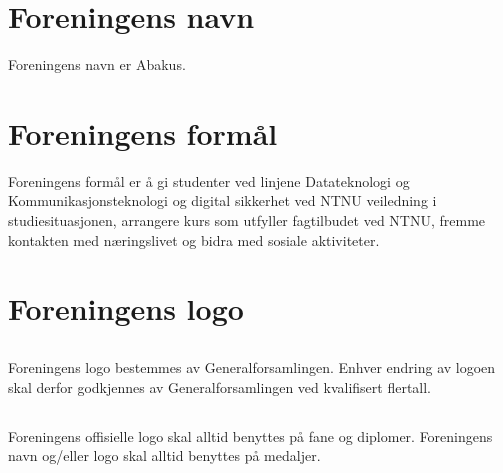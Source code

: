 \section{Foreningens navn}
Foreningens navn er Abakus.

\section{Foreningens formål}
Foreningens formål er å gi studenter ved linjene Datateknologi og
Kommunikasjonsteknologi og digital sikkerhet ved NTNU veiledning i
studiesituasjonen, arrangere kurs som utfyller fagtilbudet ved NTNU,
fremme kontakten med næringslivet og bidra med sosiale aktiviteter.

\section{Foreningens logo}

\subsection{}
Foreningens logo bestemmes av Generalforsamlingen. Enhver endring av logoen
skal derfor godkjennes av Generalforsamlingen ved kvalifisert flertall.

\subsection{}
Foreningens offisielle logo skal alltid benyttes på fane og diplomer.
Foreningens navn og/eller logo skal alltid benyttes på medaljer.
